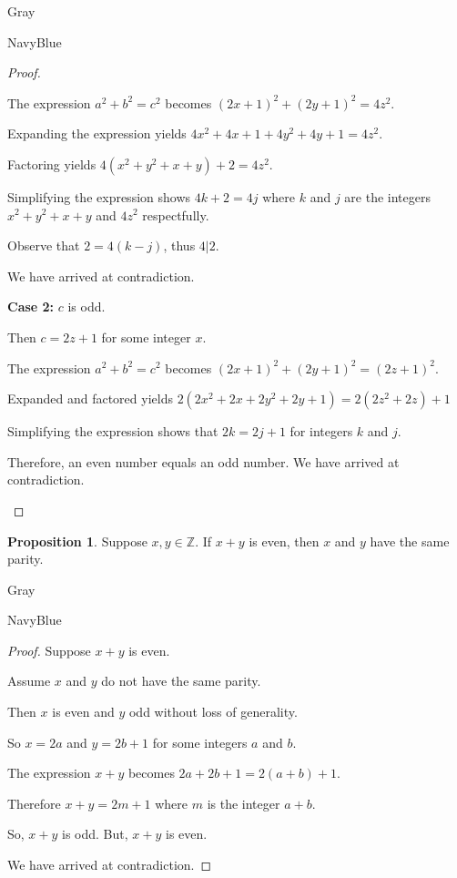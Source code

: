 \documentclass[12pt]{amsart}
\theoremstyle{named}
\newenvironment{prf}
{\medskip\begin{color}{Gray}\begin{framed}\begin{color}{NavyBlue}\begin{proof}[Proof]
\doublespacing}
{\end{proof}\end{color}\end{framed}\end{color}\medskip}
\theoremstyle{definition}
\newtheorem{proposition}{Proposition}
\newcommand{\Z}{\mathbb Z}
\begin{document}
\begin{prf}
\begin{adjustwidth}{2em}{0em}
		The expression $a^2 + b^2 = c^2$ becomes $(2x + 1)^2 + (2y+1)^2 = 4z^2$.

		Expanding the expression yields $4x^2 + 4x + 1 + 4y^2 + 4y + 1 = 4z^2$.

		Factoring yields $4(x^2+y^2+x+y)+2 = 4z^2$.

		Simplifying the expression shows $4k + 2 = 4j$ where $k$ and $j$ are
		the integers $x^2+y^2+x+y$ and $4z^2$ respectfully. 

		Observe that $2 = 4(k - j)$, thus $4|2$.
		
		We have arrived at contradiction.
	\end{adjustwidth}

	\textbf{Case 2:} $c$ is odd.
	\begin{adjustwidth}{2em}{0em}
		Then $c = 2z + 1$ for some integer $x$.

		The expression $a^2 + b^2 = c^2$ becomes $(2x + 1)^2 + (2y+1)^2 = (2z+1)^2$.

		Expanded and factored yields $2(2x^2 + 2x + 2y^2 + 2y + 1) = 2(2z^2 + 2z) + 1$

		Simplifying the expression shows that $2k = 2j + 1$ for integers $k$ and $j$.

		Therefore, an even number equals an odd number. We have arrived at contradiction.
	\end{adjustwidth}
\end{prf}

\phantom{ }

\phantom{ }

\phantom{ }

\phantom{ }
\begin{proposition}
	Suppose $x,y\in\Z$.
	If $x+y$ is even, then $x$ and $y$ have the same parity.
\end{proposition}

\begin{prf}
	\phantom{ }

	Suppose $x + y$ is even.


	Assume $x$ and $y$ do not have the same parity.

	Then $x$ is even and $y$ odd without loss of generality.

	So $x = 2a$ and $y = 2b + 1$ for some integers $a$ and $b$.

	The expression $x + y$ becomes $2a + 2b + 1 = 2(a+b) + 1$.

	Therefore $x + y = 2m + 1$ where $m$ is the integer $a+b$.

	So, $x + y$ is odd. But, $x + y$ is even.

	We have arrived at contradiction.
	
\end{prf}
\end{document}

